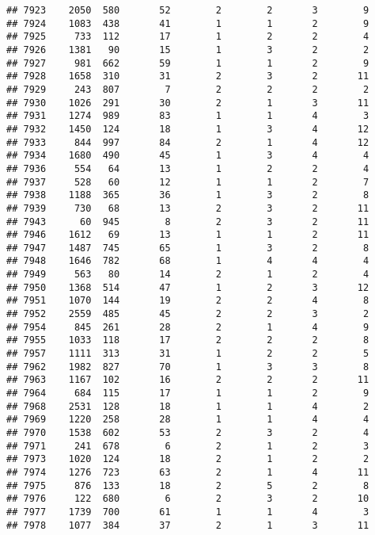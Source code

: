 \documentclass[]{article}
\begin{document}
\begin{verbatim}
## 7923    2050  580       52        2        2       3        9
## 7924    1083  438       41        1        1       2        9
## 7925     733  112       17        1        2       2        4
## 7926    1381   90       15        1        3       2        2
## 7927     981  662       59        1        1       2        9
## 7928    1658  310       31        2        3       2       11
## 7929     243  807        7        2        2       2        2
## 7930    1026  291       30        2        1       3       11
## 7931    1274  989       83        1        1       4        3
## 7932    1450  124       18        1        3       4       12
## 7933     844  997       84        2        1       4       12
## 7934    1680  490       45        1        3       4        4
## 7936     554   64       13        1        2       2        4
## 7937     528   60       12        1        1       2        7
## 7938    1188  365       36        1        3       2        8
## 7939     730   68       13        2        3       2       11
## 7943      60  945        8        2        3       2       11
## 7946    1612   69       13        1        1       2       11
## 7947    1487  745       65        1        3       2        8
## 7948    1646  782       68        1        4       4        4
## 7949     563   80       14        2        1       2        4
## 7950    1368  514       47        1        2       3       12
## 7951    1070  144       19        2        2       4        8
## 7952    2559  485       45        2        2       3        2
## 7954     845  261       28        2        1       4        9
## 7955    1033  118       17        2        2       2        8
## 7957    1111  313       31        1        2       2        5
## 7962    1982  827       70        1        3       3        8
## 7963    1167  102       16        2        2       2       11
## 7964     684  115       17        1        1       2        9
## 7968    2531  128       18        1        1       4        2
## 7969    1220  258       28        1        1       4        4
## 7970    1538  602       53        2        3       2        4
## 7971     241  678        6        2        1       2        3
## 7973    1020  124       18        2        1       2        2
## 7974    1276  723       63        2        1       4       11
## 7975     876  133       18        2        5       2        8
## 7976     122  680        6        2        3       2       10
## 7977    1739  700       61        1        1       4        3
## 7978    1077  384       37        2        1       3       11

\end{verbatim}
\end{document}

